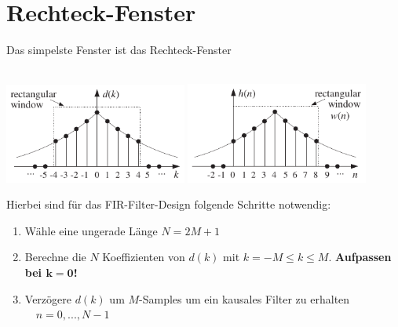 	\section{Rechteck-Fenster}
		\begin{minipage}{0.5\textwidth}
			Das simpelste Fenster ist das Rechteck-Fenster\\[0.2cm] $\qquad$\\[0.4cm]
		\end{minipage}
		\begin{minipage}{0.5\textwidth}
			\includegraphics[width = 0.45\textwidth]{pic/rechteckFensterImpulsantwort.pdf}
			\includegraphics[width = 0.45\textwidth]{pic/rechteckFensterFilter.pdf}
		\end{minipage}
		Hierbei sind für das FIR-Filter-Design folgende Schritte notwendig:
		\begin{enumerate}
		 \item Wähle eine ungerade Länge $N = 2M+1$\\[-0.6cm]
		 \item Berechne die $N$ Koeffizienten von $d(k)$ mit $k = -M\leq k\leq M$. \textbf{Aufpassen bei $\bm{k=0}$!}\\[-0.6cm]
		 \item Verzögere $d(k)$ um $M$-Samples um ein kausales Filter zu erhalten $\quad $$\quad n=0,...,N-1$
		\end{enumerate}
\newpage
		
